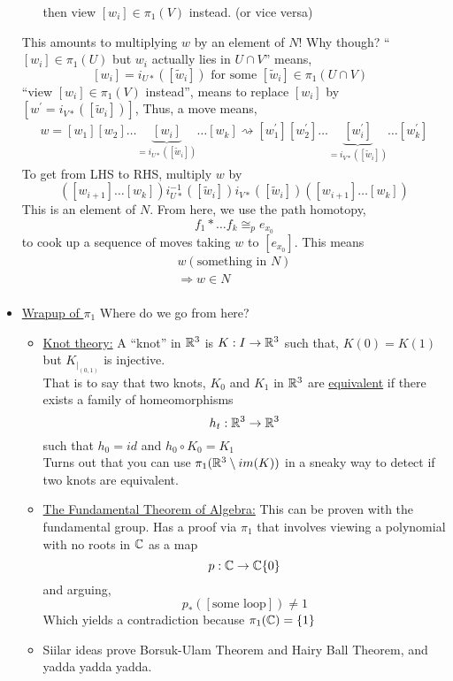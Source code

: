 \documentclass[../notes.tex]{subfiles}
\begin{document}
\begin{itemize}
\begin{itemize}
                then view $[w_i]\in\pi_1(V)$ instead. (or vice versa)
        \end{itemize}
        This amounts to multiplying $w$ by an element of $N$! Why though?
        ``$[w_i]\in \pi_1(U)$ but $w_i$ actually lies in $U\cap V$''
        means,
        \[
            [w_i]=i_{U*}([\tilde{w}_i])\text{ for some $[\tilde{w}_i]\in \pi_1(U\cap V)$ }
        \]
        ``view $[w_i]\in \pi_1(V)$ instead'', means to replace $[w_i]$ by 
        $[w^{\prime}=i_{V*}([\tilde{w}_i])]$, Thus, a move means,
        \begin{align*}
            w=[w_1][w_2]\dots\underbrace{[w_i]}_{=i_{U*}([\tilde{w}_i])}\dots[w_k]\rightsquigarrow 
            [w^{\prime}_1][w^{\prime}_2]\dots\underbrace{[w^{\prime}_i]}_{=i_{V*}([\tilde{w}_i])}\dots[w^{\prime}_k]
        \end{align*}
        To get from LHS to RHS, multiply $w$ by
        \[
            ([w_{i+1}]\dots[w_{k}])i_{U*}^{-1}([\tilde{w}_i])i_{V*}([\tilde{w}_i])([w_{i+1}]\dots[w_k])
        \]
        This is an element of $N$.
        From here, we use the path homotopy,
        \[
            f_1*\dots f_k\cong_{p}e_{x_0}
        \]
        to cook up a sequence of moves taking $w$ to $[e_{x_0}]$. This means
        \begin{align*}
            w(\text{something in $N$})\\
            \Rightarrow w\in N\\
        \end{align*}
    \item \underline{Wrapup of $\pi_1$}
        Where do we go from here?
        \begin{itemize}
            \item \underline{Knot theory:} A ``knot'' in $\mathbb{R}^3$ is $K:I\rightarrow \mathbb{R}^3$ such that,
                $K(0)=K(1)$ but $K_{|_{(0,1)}}$ is injective.\\
                That is to say that two knots, $K_0$ and $K_1$ in $\mathbb{R}^3$ are \underline{equivalent} if there exists a family
                of homeomorphisms
                \[
                    h_t:\mathbb{R}^3\rightarrow \mathbb{R}^3\\
                \]
                such that $h_0=id$ and $h_0\circ K_0=K_1$\\
                Turns out that you can use $\pi_1(\mathbb{R}^3\setminus im(K))$ in a sneaky way to
                detect if two knots are equivalent.
            \item \underline{The Fundamental Theorem of Algebra:} This can be proven with the
                fundamental group. Has a proof via $\pi_1$ that involves viewing a polynomial with no roots in $\mathbb{C}$ as
                a map
                \[
                    p: \mathbb{C} \rightarrow \mathbb{C}\{0\}
                \]
                and arguing,
                \[
                    p_{*}([\text{some loop}])\neq 1
                \]
                Which yields a contradiction because $\pi_1(\mathbb{C})=\{1\}$
            \item Siilar ideas prove Borsuk-Ulam Theorem and Hairy Ball Theorem, and yadda yadda yadda.
        \end{itemize}
    \end{itemize}
\end{document}
